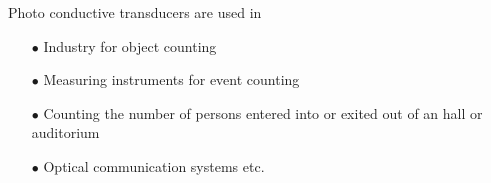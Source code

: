 Photo conductive transducers are used in
\begin{itemize}
\item[$\bullet$] Industry for object counting

\item[$\bullet$] Measuring instruments for event counting

\item[$\bullet$] Counting the number of persons entered into or exited out of an hall or auditorium

\item[$\bullet$] Optical communication systems etc.
\end{itemize}


